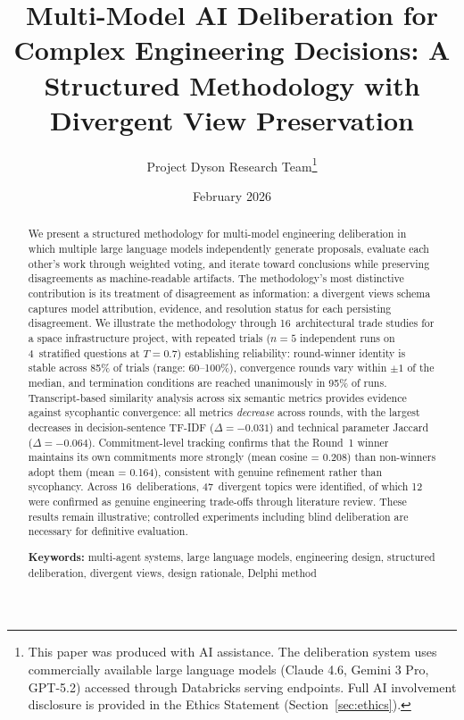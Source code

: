 \documentclass[11pt,a4paper]{article}
\title{\textbf{Multi-Model AI Deliberation for Complex Engineering Decisions: A Structured Methodology with Divergent View Preservation}}
\author{Project Dyson Research Team\thanks{This paper was produced with AI assistance. The deliberation system uses commercially available large language models (Claude 4.6, Gemini 3 Pro, GPT-5.2) accessed through Databricks serving endpoints. Full AI involvement disclosure is provided in the Ethics Statement (Section~\ref{sec:ethics}).}}
\affil{Project Dyson --- Open-Source Space Infrastructure Initiative\\ \texttt{https://projectdyson.org}}
\date{February 2026}
\begin{document}
\maketitle

\begin{abstract}
We present a structured methodology for multi-model engineering deliberation in which multiple large language models independently generate proposals, evaluate each other's work through weighted voting, and iterate toward conclusions while preserving disagreements as machine-readable artifacts. The methodology's most distinctive contribution is its treatment of disagreement as information: a divergent views schema captures model attribution, evidence, and resolution status for each persisting disagreement. We illustrate the methodology through 16~architectural trade studies for a space infrastructure project, with repeated trials ($n = 5$ independent runs on 4~stratified questions at $T = 0.7$) establishing reliability: round-winner identity is stable across 85\% of trials (range: 60--100\%), convergence rounds vary within $\pm 1$ of the median, and termination conditions are reached unanimously in 95\% of runs. Transcript-based similarity analysis across six semantic metrics provides evidence against sycophantic convergence: all metrics \emph{decrease} across rounds, with the largest decreases in decision-sentence TF-IDF ($\Delta = -0.031$) and technical parameter Jaccard ($\Delta = -0.064$). Commitment-level tracking confirms that the Round~1 winner maintains its own commitments more strongly (mean cosine = 0.208) than non-winners adopt them (mean = 0.164), consistent with genuine refinement rather than sycophancy. Across 16~deliberations, 47~divergent topics were identified, of which 12 were confirmed as genuine engineering trade-offs through literature review. These results remain illustrative; controlled experiments including blind deliberation are necessary for definitive evaluation.

\medskip
\noindent\textbf{Keywords:} multi-agent systems, large language models, engineering design, structured deliberation, divergent views, design rationale, Delphi method
\end{abstract}

\onehalfspacing

\end{document}
